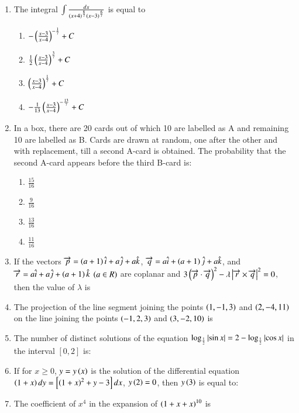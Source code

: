 \documentclass[journal,9pt,twocolumn]{IEEEtran}
\begin{document}
\begin{enumerate}
    \item The integral $\int\frac{dx}{\left(x+4\right)^{\frac{8}{7}}\left(x-3\right)^{\frac{6}{7}}}$ is equal to

		\begin{multicols}{2}
			\begin{enumerate}
				\item $-\left(\frac{x-3}{x-4}\right)^{-\frac{1}{7}}+C$
				\item $\frac{1}{2}\left(\frac{x-3}{x-4}\right)^{\frac{3}{7}}+C$
				\item $\left(\frac{x-3}{x-4}\right)^{\frac{1}{7}}+C$
				\item $-\frac{1}{13}\left(\frac{x-3}{x-4}\right)^{-\frac{13}{7}}+C$
			\end{enumerate}
		\end{multicols}

    \item In a box, there are 20 cards out of which 10 are labelled as A and remaining 10 are labelled as B. Cards are drawn at random, one after the other and with replacement, till a second A-card is obtained. The probability that the second A-card appears before the third B-card is:

		\begin{multicols}{4}
			\begin{enumerate}
				\item $\frac{15}{16}$
				\item $\frac{9}{16}$
				\item $\frac{13}{16}$
				\item $\frac{11}{16}$
			\end{enumerate}
		\end{multicols}

    \item If the vectors $\overrightarrow{p} = \left(a+1\right)\hat{i}+a\hat{j}+a\hat{k}$, $\overrightarrow{q} = a\hat{i}+\left(a+1\right)\hat{j}+a\hat{k}$, and $\overrightarrow{r} = a\hat{i}+a\hat{j}+\left(a+1\right)\hat{k}$ $\left(a\in R\right)$ are coplanar and $3\left(\overrightarrow{p}\cdot\overrightarrow{q}\right)^2 - \lambda\left\vert\overrightarrow{r}\times \overrightarrow{q}\right\vert^2=0$, then the value of $\lambda$ is

    \item The projection of the line segment joining the points $\left(1,-1,3\right)$ and $\left(2,-4,11\right)$ on the line joining the points $\left(-1,2,3\right)$ and $\left(3,-2,10\right)$ is
		
    \item The number of distinct solutions of the equation $\log_{\frac{1}{2}}\left\vert\sin x\right\vert = 2-\log_{\frac{1}{2}}\left\vert\cos x\right\vert$ in the interval $\left[0, 2\right]$ is:

    \item If for $x\geq 0$, $y=y\left(x\right)$ is the solution of the differential equation $\left(1+x\right)dy=\left[ \left(1+x\right)^2 +y-3\right]dx$, $y\left(2\right)=0$, then $y\left(3\right)$ is equal to:
	
    \item The coefficient of $x^4$ in the expansion of $\left(1+x+x\right)^{10}$ is

\end{enumerate}
\end{document}
